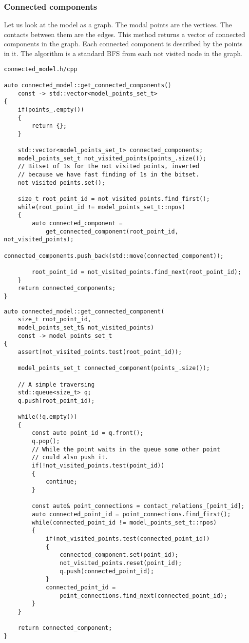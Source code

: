 \documentclass{article}
\begin{document}
	\newpage
	\subsubsection*{Connected components}
	Let us look at the model as a graph. The modal points are the vertices. The contacts between them are the edges. This method returns a vector of connected components in the graph. Each connected component is described by the points in it. The algorithm is a standard BFS from each not visited node in the graph.
\\
\begin{lstlisting}
connected_model.h/cpp

auto connected_model::get_connected_components()
	const -> std::vector<model_points_set_t>
{
    if(points_.empty())
    {
        return {};
    }

    std::vector<model_points_set_t> connected_components;
    model_points_set_t not_visited_points(points_.size());
    // Bitset of 1s for the not visited points, inverted
    // because we have fast finding of 1s in the bitset.
    not_visited_points.set();

    size_t root_point_id = not_visited_points.find_first();
    while(root_point_id != model_points_set_t::npos)
    {
        auto connected_component =
            get_connected_component(root_point_id, not_visited_points);
        connected_components.push_back(std::move(connected_component));

        root_point_id = not_visited_points.find_next(root_point_id);
    }
    return connected_components;
}
\end{lstlisting}
\newpage
\begin{lstlisting}
auto connected_model::get_connected_component(
	size_t root_point_id,
	model_points_set_t& not_visited_points)
	const -> model_points_set_t
{
    assert(not_visited_points.test(root_point_id));

    model_points_set_t connected_component(points_.size());

    // A simple traversing
    std::queue<size_t> q;
    q.push(root_point_id);

    while(!q.empty())
    {
        const auto point_id = q.front();
        q.pop();
        // While the point waits in the queue some other point
        // could also push it.
        if(!not_visited_points.test(point_id))
        {
            continue;
        }

        const auto& point_connections = contact_relations_[point_id];
        auto connected_point_id = point_connections.find_first();
        while(connected_point_id != model_points_set_t::npos)
        {
            if(not_visited_points.test(connected_point_id))
            {
                connected_component.set(point_id);
                not_visited_points.reset(point_id);
                q.push(connected_point_id);
            }
            connected_point_id =
                point_connections.find_next(connected_point_id);
        }
    }

    return connected_component;
}
\end{lstlisting}
\end{document}
